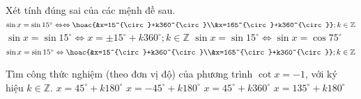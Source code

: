 
\begin{ex}%
 Xét tính đúng sai của các  mệnh đề sau.
  \choiceTF
  {$\sin  x=\sin 15^{\circ}\Leftrightarrow\Leftrightarrow\hoac{&x=15^{\circ}+k360^{\circ}\\&x=165^{\circ}+k360^{\circ}}; k\in\mathbb{Z}$}
  {$\sin x=\sin 15^{\circ}\Leftrightarrow x=\pm  15^{\circ}+k360^{\circ}; k\in\mathbb{Z}$}
  {\True $\sin x=\sin 15^{\circ}\Leftrightarrow\sin  x=\cos75^\circ$}
   {\True $\sin x=\sin 15^{\circ}\Leftrightarrow\hoac{&x=15^{\circ}+k360^{\circ}\\&x=165^{\circ}+k360^{\circ}}; k\in\mathbb{Z}$}
\end{ex}

\begin{ex}%
 Tìm công  thức nghiệm (theo đơn vị độ) của phương trình $\cot x=-1$, với ký hiệu $k\in\mathbb{Z}$.
 \choiceTF 
  {$x=45^{\circ}+k180^{\circ}$} 
  {\True  $x=-45^{\circ}+k180^{\circ}$}
  {$x=45^{\circ}+k360^{\circ}$} 
  {\True  $x=135^{\circ}+k180^{\circ}$}
\end{ex}

